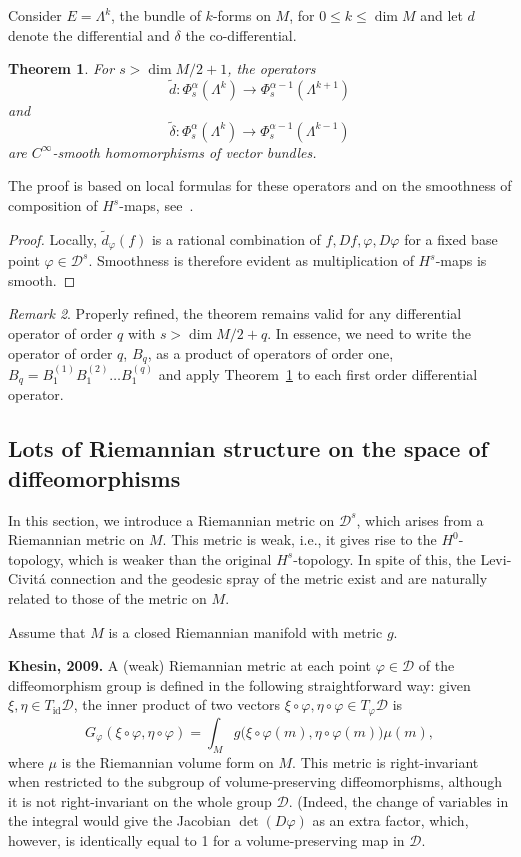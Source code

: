 \documentclass[a5paper,10pt,twoside]{article}
\newcommand{\cD}{\ensuremath{\mathcal{D}}}
\DeclareMathOperator*{\id}{id}
\theoremstyle{plain}
\newtheorem{teo}{Theorem}[section]
\theoremstyle{definition}
\theoremstyle{remark}
\newtheorem{rem}[teo]{Remark}
\begin{document}
Consider $E=\Lambda^k$, the bundle of $k$-forms on $M$, for $0\leq k\leq\dim M$ and let $d$ denote the differential and $\delta$ the co-differential.

\begin{teo}
\label{teo:smooth-d-operator}
For $s>\dim M/2 +1$, the operators 
\[
\tilde{d}:\Phi_s^\alpha(\Lambda^k)\to \Phi_s^{\alpha-1}(\Lambda^{k+1})
\]
and
\[
\tilde{\delta}: \Phi_s^\alpha(\Lambda^k)\to \Phi_s^{\alpha-1}(\Lambda^{k-1})
\]
are $C^\infty$-smooth homomorphisms of vector bundles.
\end{teo} 

The proof is based on local formulas for these operators and on the smoothness of composition of $H^s$-maps, see~\cite{ebin1970groups}. 

\begin{proof}
Locally, $\tilde{d}_\varphi(f)$ is a rational combination of $f,Df,\varphi,D\varphi$ for a fixed base point $\varphi\in\cD^s$. Smoothness is therefore evident as multiplication of $H^s$-maps is smooth.
\end{proof}

\begin{rem} 
\label{rem:smooth-d-operator}
Properly refined, the theorem remains valid for any differential operator of order $q$ with $s>\dim M / 2+q$. In essence, we need to write the operator of order $q$, $B_q$, as a product of operators of order one, $B_q=B_1^{(1)}B_1^{(2)}\dots B_1^{(q)}$ and apply Theorem~\ref{teo:smooth-d-operator} to each first order differential operator.
\end{rem}

\subsection{Lots of Riemannian structure on the space of diffeomorphisms}
In this section, we introduce a Riemannian metric on $\cD^s$, which arises
from a Riemannian metric on $M$. This metric is weak, i.e., it gives rise to the
$H^0$-topology, which is weaker than the original $H^s$-topology. In spite of this,
the Levi-Civitá connection and the geodesic spray of the metric exist and are
naturally related to those of the metric on $M.$

Assume that $M$ is a closed Riemannian manifold with metric $g$.

\textbf{Khesin, 2009.} A (weak) Riemannian metric at each point $\varphi\in \cD$ of the diffeomorphism
group is defined in the following straightforward way: given
$\xi,\eta\in T_{\id}\cD$, the inner product of two vectors $\xi\circ\varphi,\eta\circ\varphi\in T_\varphi\cD$ is
%
\begin{equation}
\label{weak-metric-non-invariant}
G_\varphi(\xi\circ\varphi,\eta\circ\varphi)=\int_M g\big( \xi\circ\varphi(m),\eta\circ\varphi(m)\big)\mu(m),
\end{equation}
%
where $\mu$ is the Riemannian volume form on $M$. This metric is right-invariant when restricted to the subgroup  of volume-preserving diffeomorphisms, although it is not right-invariant on the whole group $\cD$. (Indeed, the change of variables in the integral 
would give the Jacobian $\det(D\varphi)$ as an extra factor, which, however, is
identically equal to 1 for a volume-preserving map in $\cD$.
\end{document}
